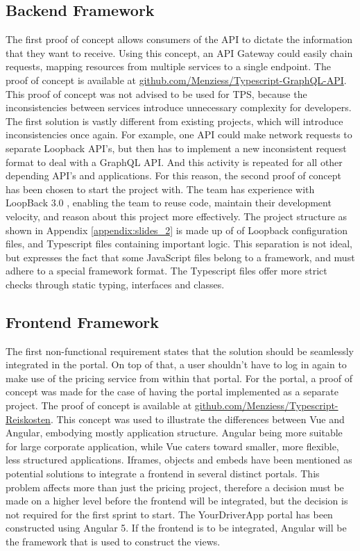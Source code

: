 \subsection{Backend Framework}
The first proof of concept allows consumers of the API to dictate the information that they want to receive. Using this concept, an API Gateway could easily chain requests, mapping resources from multiple services to a single endpoint. The proof of concept is available at \url{github.com/Menziess/Typescript-GraphQL-API}. This proof of concept was not advised to be used for TPS, because the inconsistencies between services introduce unnecessary complexity for developers. The first solution is vastly different from existing projects, which will introduce inconsistencies once again. For example, one API could make network requests to separate Loopback API's, but then has to implement a new inconsistent request format to deal with a GraphQL API. And this activity is repeated for all other depending API's and applications. For this reason, the second proof of concept has been chosen to start the project with. The team has experience with LoopBack 3.0 \cite{lb}, enabling the team to reuse code, maintain their development velocity, and reason about this project more effectively. The project structure as shown in Appendix \ref{appendix:slides_2} is made up of of Loopback configuration files, and Typescript files containing important logic. This separation is not ideal, but expresses the fact that some JavaScript files belong to a framework, and must adhere to a special framework format. The Typescript files offer more strict checks through static typing, interfaces and classes.

\subsection{Frontend Framework}
The first non-functional requirement states that the solution should be seamlessly integrated in the portal. On top of that, a user shouldn’t have to log in again to make use of the pricing service from within that portal. For the portal, a proof of concept was made for the case of having the portal implemented as a separate project. The proof of concept is available at \url{github.com/Menziess/Typescript-Reiskosten}. This concept was used to illustrate the differences between Vue and Angular, embodying mostly application structure. Angular being more suitable for large corporate application, while Vue caters toward smaller, more flexible, less structured applications. Iframes, objects and embeds have been mentioned as potential solutions to integrate a frontend in several distinct portals. This problem affects more than just the pricing project, therefore a decision must be made on a higher level before the frontend will be integrated, but the decision is not required for the first sprint to start. The YourDriverApp portal has been constructed using Angular 5. If the frontend is to be integrated, Angular will be the framework that is used to construct the views.

